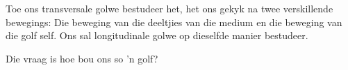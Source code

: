 \label{m38782*id292159}
  Toe ons transversale golwe bestudeer het, het ons gekyk na twee verskillende bewegings: Die beweging van die deeltjies van die medium en die beweging van die golf self. Ons sal longitudinale golwe op dieselfde manier bestudeer.\par 
      \label{m38782*id292164}Die vraag is hoe bou ons so 'n golf?\par 

